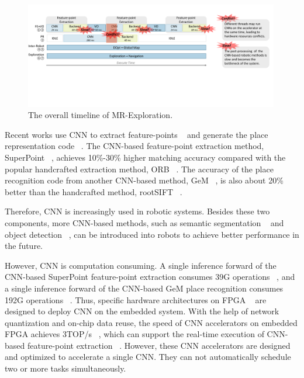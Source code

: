 \begin{figure}[t]
    \centering
    \vspace{-0.3cm} 
    \setlength{\abovecaptionskip}{0cm} 
    \setlength{\belowcaptionskip}{-0.2cm} 
	\includegraphics[width=0.99\textwidth]{fig/overalltime.pdf} 	
    \caption{
    The overall timeline of MR-Exploration.
    }
	\label{fig:overalltime}
\end{figure}

Recent works use CNN to extract feature-points  ~\cite{detone2018superpoint, simo2015discriminative, yi2016lift} and generate the place representation code  ~\cite{arandjelovic2016netvlad, radenovic2018fine}. 
The CNN-based feature-point extraction method, SuperPoint  ~\cite{detone2018superpoint}, achieves 10\%-30\% higher matching accuracy compared with the popular handcrafted extraction method, ORB ~\cite{Mur-Artal:2017281}.
The accuracy of the place recognition code from another CNN-based method, GeM  ~\cite{radenovic2018fine}, is also about 20\% better than the handcrafted method, rootSIFT  ~\cite{jegou2014triang}.

Therefore, CNN is increasingly used in robotic systems. 
Besides these two components, more CNN-based methods, such as semantic segmentation  ~\cite{long2015fully} and object detection  ~\cite{ren2015faster}, can be introduced into robots to achieve better performance in the future.

However, CNN is computation consuming. A single inference forward of the CNN-based SuperPoint feature-point extraction consumes 39G operations  ~\cite{detone2018superpoint}, and a single inference forward of the CNN-based GeM  place recognition consumes 192G operations  ~\cite{radenovic2018fine}.
Thus, specific hardware architectures on FPGA  ~\cite{guo2017angel,yu2018instruction,li_high_2016,qiu2016going,lu_evaluating_2017} are designed to deploy CNN on the embedded system.
With the help of network quantization and on-chip data reuse, the speed of CNN accelerators on embedded FPGA achieves 3TOP/s  ~\cite{lu_evaluating_2017}, which can support the real-time execution of CNN-based feature-point extraction  ~\cite{detone2018superpoint}.
However, these CNN accelerators are designed and optimized to accelerate a single CNN. They can not automatically schedule two or more tasks simultaneously. 


